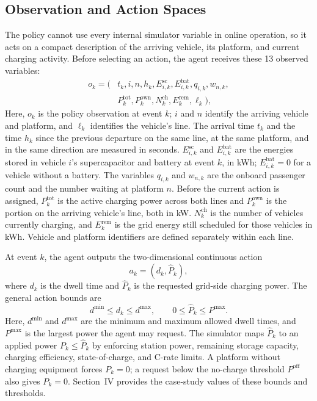 \documentclass[conference]{IEEEtran}
\begin{document}
\subsection{Observation and Action Spaces}
The policy cannot use every internal simulator variable in online operation, so it acts on a compact description of the arriving vehicle, its platform, and current charging activity. Before selecting an action, the agent receives these 13 observed variables:
\begin{align}
 o_k = (&t_k,i,n,h_k,E^{\mathrm{sc}}_{i,k},E^{\mathrm{bat}}_{i,k},
 q_{i,k},w_{n,k},\nonumber\\
 &P^{\mathrm{tot}}_k,P^{\mathrm{own}}_k,N^{\mathrm{ch}}_k,
 E^{\mathrm{rem}}_k,\ell_k),
\end{align}
Here, $o_k$ is the policy observation at event $k$; $i$ and $n$ identify the arriving vehicle and platform, and $\ell_k$ identifies the vehicle's line. The arrival time $t_k$ and the time $h_k$ since the previous departure on the same line, at the same platform, and in the same direction are measured in seconds. $E^{\mathrm{sc}}_{i,k}$ and $E^{\mathrm{bat}}_{i,k}$ are the energies stored in vehicle $i$'s supercapacitor and battery at event $k$, in kWh; $E^{\mathrm{bat}}_{i,k}=0$ for a vehicle without a battery. The variables $q_{i,k}$ and $w_{n,k}$ are the onboard passenger count and the number waiting at platform $n$. Before the current action is assigned, $P^{\mathrm{tot}}_k$ is the active charging power across both lines and $P^{\mathrm{own}}_k$ is the portion on the arriving vehicle's line, both in kW. $N^{\mathrm{ch}}_k$ is the number of vehicles currently charging, and $E^{\mathrm{rem}}_k$ is the grid energy still scheduled for those vehicles in kWh. Vehicle and platform identifiers are defined separately within each line.

At event $k$, the agent outputs the two-dimensional continuous action
\begin{equation}
    a_k = (d_k, \widehat{P}_k),
\end{equation}
where $d_k$ is the dwell time and $\widehat{P}_k$ is the requested grid-side charging power. The general action bounds are
\begin{equation}
    d^{\min} \le d_k \le d^{\max}, \qquad
    0 \le \widehat{P}_k \le P^{\max}.
\end{equation}
Here, $d^{\min}$ and $d^{\max}$ are the minimum and maximum allowed dwell times, and $P^{\max}$ is the largest power the agent may request. The simulator maps $\widehat{P}_k$ to an applied power $P_k\leq\widehat{P}_k$ by enforcing station power, remaining storage capacity, charging efficiency, state-of-charge, and C-rate limits. A platform without charging equipment forces $P_k=0$; a request below the no-charge threshold $P^{\mathrm{off}}$ also gives $P_k=0$. Section~IV provides the case-study values of these bounds and thresholds.
\end{document}
